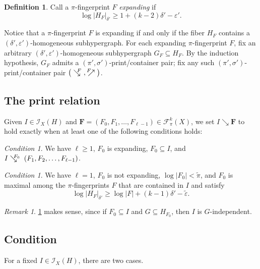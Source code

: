 \documentclass[12pt,reqno]{amsart}
\theoremstyle{plain}
\theoremstyle{definition}
\newtheorem{defn}[equation]{Definition}
\theoremstyle{remark}
\newtheorem{remark}[equation]{Remark}
\newtheorem{condition}[equation]{Condition}
\newcommand{\0}{\mathbb{\emptyset}}
\newcommand{\de}{\delta}
\newcommand{\e}{\varepsilon}
\newcommand{\si}{\sigma}
\newcommand{\FC}{\mathcal{F}}
\newcommand{\IC}{\mathcal{I}}
\newcommand{\capsize}[2]{\left|#2\right|_{#1}}
\newcommand{\Prints}[1][k]{\FC_\pi^{#1}(X)}
\newcommand{\Print}{\boldsymbol{F}}
\newcommand{\prel}{\searrow}
\newcommand{\prelG}[1]{\mathrel{\;\:\mathclap{\searrow}{{}^{#1}}\;}}
\newcommand{\crelG}[1]{\mathrel{{}^{#1}\mathclap{\nearrow}{\;\:}}}
\begin{document}
\begin{defn}
	Call a $\pi$-fingerprint $F$ \emph{expanding} if \[\log|H_F|_{\de'} \geq 1 + (k-2)\de' - \e'.\]
\end{defn}

Notice that a $\pi$-fingerprint $F$ is expanding if and only if the fiber $H_F$ contains a $(\de', \e')$-homogeneous subhypergraph. For each expanding $\pi$-fingerprint $F$, fix an arbitrary $(\de', \e')$-homogeneous subhypergraph $G_F \subseteq H_F$. By the induction hypothesis, $G_F$ admits a $(\pi', \si')$-print/container pair; fix any such $(\pi', \si')$-print/container pair $\big(\prelG{F}, \crelG{F}\big)$.

\subsection{The print relation}

Given $I \in \IC_X(H)$ and $\Print = (F_0, F_1, \hdots, F_{\ell-1}) \in \Prints$, we set $I \prel \Print$ to hold exactly when at least one of the following conditions holds:

\begin{condition}\label{cond:finite:print:inductive}
	We have $\ell \geq 1$, $F_0$ is expanding, $F_0 \subseteq I$, and $I \prelG{F_0} (F_1, F_2, \hdots, F_{\ell-1})$.
\end{condition}

\begin{condition}\label{cond:finite:print:noninductive}
	We have $\ell = 1$, $F_0$ is not expanding, $\log|F_0| < \tilde\pi$, and $F_0$ is maximal among the $\pi$-fingerprints $F$ that are contained in $I$ and satisfy
	\begin{equation}\label{eq:finite:expansive}
	\log\capsize{\de'}{H_F} \ge \log|F| + (k-1) \de' - \tilde\e.
	\end{equation}
\end{condition}

\begin{remark}
	\cref{cond:finite:print:inductive} makes sense, since if $F_0 \subseteq I$ and $G \subseteq H_{F_0}$, then $I$ is $G$-independent.
\end{remark}


\subsection{Condition }

For a fixed $I \in \IC_X(H)$, there are two cases.
\end{document}
